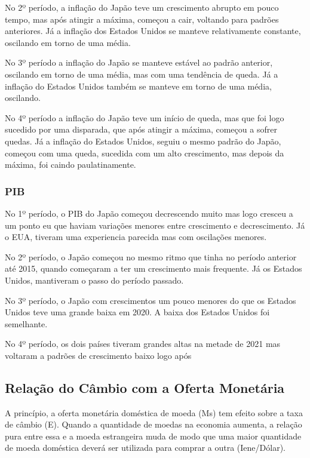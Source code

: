 \documentclass[a4paper,12pt]{article}[abntex2]
\begin{document}
No 2º período, a inflação do Japão teve um crescimento abrupto em pouco tempo, mas após atingir a máxima, começou a cair, voltando para padrões anteriores. Já a inflação dos Estados Unidos se manteve relativamente constante, oscilando em torno de uma média.

No 3º período a inflação do Japão se manteve estável ao padrão anterior, oscilando em torno de uma média, mas com uma tendência de queda. Já a inflação do Estados Unidos também se manteve em torno de uma média, oscilando.

No 4º período a inflação do Japão teve um início de queda, mas que foi logo sucedido por uma disparada, que após atingir a máxima, começou a sofrer quedas. Já a inflação do Estados Unidos, seguiu o mesmo padrão do Japão, começou com uma queda, sucedida com um alto crescimento, mas depois da máxima, foi caindo paulatinamente. 

\subsubsection{\textbf{PIB}}
No 1º período, o PIB do Japão começou decrescendo muito mas logo cresceu a um ponto eu que haviam variações menores entre crescimento e decrescimento. Já o EUA, tiveram uma experiencia parecida mas com oscilações menores.

No 2º período, o Japão começou no mesmo ritmo que tinha no período anterior até 2015, quando começaram a ter um crescimento mais frequente. Já os Estados Unidos, mantiveram o passo do período passado.

No 3º período, o Japão com crescimentos um pouco menores do que os Estados Unidos teve uma grande baixa em 2020. A baixa dos Estados Unidos foi semelhante.

No 4º período, os dois países tiveram grandes altas na metade de 2021 mas voltaram a padrões de crescimento baixo logo após

\subsection{\textbf{Relação do Câmbio com a Oferta Monetária}}

A princípio, a oferta monetária doméstica de moeda (Ms) tem efeito sobre a taxa de câmbio (E). Quando a quantidade de moedas na economia aumenta, a relação pura entre essa e a moeda estrangeira muda de modo que uma maior quantidade de moeda doméstica deverá ser utilizada para comprar a outra (Iene/Dólar). 
\end{document}
